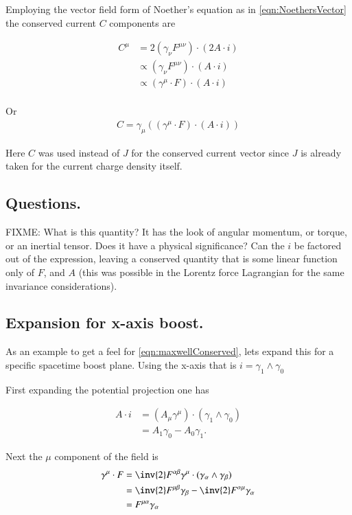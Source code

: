 \documentclass{article}
\begin{document}
Employing the vector field form of Noether's equation as in \ref{eqn:NoethersVector} the conserved current $C$ components are

\begin{align*}
C^\mu &= 2 (\gamma_\nu F^{\mu\nu}) \cdot (2 A \cdot i) \\
&\propto (\gamma_\nu F^{\mu\nu}) \cdot (A \cdot i) \\
&\propto (\gamma^\mu \cdot F) \cdot (A \cdot i) \\
\end{align*}

Or 
\begin{align}\label{eqn:maxwellConserved}
C = \gamma_\mu ((\gamma^\mu \cdot F) \cdot (A \cdot i))
\end{align}

Here $C$ was used instead of $J$ for the conserved current vector since $J$ is already taken for the current charge density itself.

\subsection{ Questions. }

FIXME: What is this quantity?  It has the look of
angular momentum, or torque, or an inertial tensor.  Does it have a physical significance?  Can the $i$ be factored out of the expression, leaving a conserved quantity that is some linear function only of $F$, and $A$ (this was possible in the Lorentz force Lagrangian for the same invariance considerations).

\subsection{ Expansion for x-axis boost. }

As an example to get a feel for \ref{eqn:maxwellConserved}, lets expand
this for a specific spacetime boost plane.  Using the x-axis that is $i=\gamma_1 \wedge \gamma_0$

First expanding the potential projection one has

\begin{align*}
A \cdot i &= (A_\mu \gamma^\mu) \cdot (\gamma_1 \wedge \gamma_0) \\
&= A_1 \gamma_0 - A_0 \gamma_1.
\end{align*}

Next the $\mu$ component of the field is
\begin{align*}
\gamma^\mu \cdot F
&= \inv{2} F^{\alpha\beta} \gamma^\mu \cdot (\gamma_\alpha \wedge \gamma_\beta) \\
&= \inv{2} F^{\mu\beta} \gamma_\beta -\inv{2} F^{\alpha\mu} \gamma_\alpha \\
&= F^{\mu\alpha} \gamma_\alpha \\
\end{align*}
\end{document}
